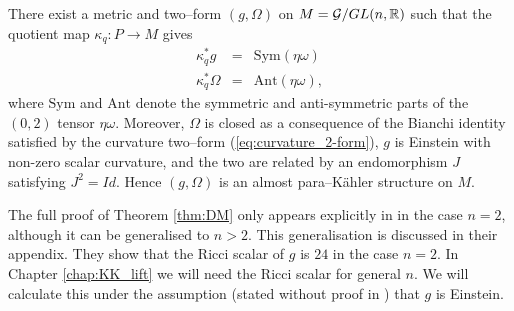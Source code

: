 \begin{theo}{\cite{DM}}\label{thm:DM}
There exist a metric and two--form
$(g,\Omega)$ on $\mbox{\ensuremath{M=\mathcal{G}/GL(n,\mathbb{R})}}$ such
that the quotient map $\kappa_q:P\rightarrow M$ gives
\begin{eqnarray} 
\kappa_q^{*}g & = & \mathrm{Sym}(\eta\omega) \label{eq:g_cartan} \\
\kappa_q^{*}\Omega & = & \mathrm{Ant}(\eta\omega), \label{eq:Omega_cartan}
\end{eqnarray}
where $\mathrm{Sym}$ and $\mathrm{Ant}$ denote the symmetric and
anti-symmetric parts of the $(0,2)$ tensor $\eta\omega$. Moreover,
$\Omega$ is closed as a consequence of the Bianchi identity satisfied by the curvature two--form (\ref{eq:curvature_2-form}), $g$
is Einstein with non-zero scalar curvature, and the two are related
by an endomorphism $J$ satisfying $J^{2}=Id$. Hence $(g,\Omega)$
is an almost para--K\"ahler structure on $M$.
\end{theo}


\begin{rmk}
The full proof of Theorem \ref{thm:DM} only appears explicitly in \cite{DM} in the case $n=2$, although it can be generalised to $n>2$. This generalisation is discussed in their appendix. They show that the Ricci scalar of $g$ is $24$ in the case $n=2$. In Chapter \ref{chap:KK_lift} we will need the Ricci scalar for general $n$. We will calculate this under the assumption (stated without proof in \cite{DM}) that $g$ is Einstein.
\end{rmk}

